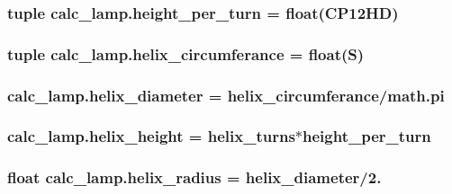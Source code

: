 \subsubsection[{height\+\_\+per\+\_\+turn}]{\setlength{\rightskip}{0pt plus 5cm}tuple calc\+\_\+lamp.\+height\+\_\+per\+\_\+turn = float({\bf C\+P12\+H\+D})}\label{namespacecalc__lamp_aae862acf48d47d29de10038c66c88186}
\hypertarget{namespacecalc__lamp_a9992b66c8618f2824a778cc98e6e95b3}{}
\subsubsection[{helix\+\_\+circumferance}]{\setlength{\rightskip}{0pt plus 5cm}tuple calc\+\_\+lamp.\+helix\+\_\+circumferance = float({\bf S})}\label{namespacecalc__lamp_a9992b66c8618f2824a778cc98e6e95b3}
\hypertarget{namespacecalc__lamp_a4c2cdb9deaceccbc732e80467c88f8fa}{}
\subsubsection[{helix\+\_\+diameter}]{\setlength{\rightskip}{0pt plus 5cm}calc\+\_\+lamp.\+helix\+\_\+diameter = {\bf helix\+\_\+circumferance}/math.\+pi}\label{namespacecalc__lamp_a4c2cdb9deaceccbc732e80467c88f8fa}
\hypertarget{namespacecalc__lamp_ab2143c5488cff230353890b72615d7b4}{}
\subsubsection[{helix\+\_\+height}]{\setlength{\rightskip}{0pt plus 5cm}calc\+\_\+lamp.\+helix\+\_\+height = {\bf helix\+\_\+turns}$\ast${\bf height\+\_\+per\+\_\+turn}}\label{namespacecalc__lamp_ab2143c5488cff230353890b72615d7b4}
\hypertarget{namespacecalc__lamp_a9fae0936f2cfe1102b12afe7d72667a6}{}
\subsubsection[{helix\+\_\+radius}]{\setlength{\rightskip}{0pt plus 5cm}float calc\+\_\+lamp.\+helix\+\_\+radius = {\bf helix\+\_\+diameter}/2.}\label{namespacecalc__lamp_a9fae0936f2cfe1102b12afe7d72667a6}
\hypertarget{namespacecalc__lamp_a16e8ac2cfa1d3f1b02d7699fb1f0e5d0}{}
